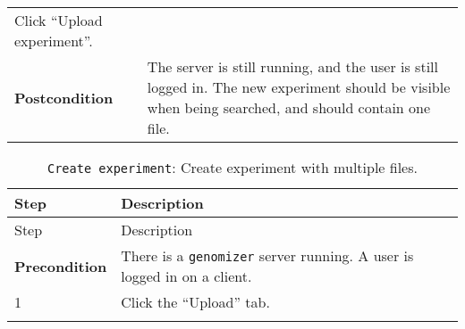 \begin{longtable}[c]{@{}ll@{}}
\begin{minipage}[t]{0.63\columnwidth}\raggedright\strut
Click ``Upload experiment''.
\strut\end{minipage}\tabularnewline
\begin{minipage}[t]{0.31\columnwidth}\raggedright\strut
\textbf{Postcondition}
\strut\end{minipage} &
\begin{minipage}[t]{0.63\columnwidth}\raggedright\strut
The server is still running, and the user is still logged in. The new
experiment should be visible when being searched, and should contain one
file.
\strut\end{minipage}\tabularnewline
\bottomrule
\end{longtable}

\begin{longtable}[c]{@{}ll@{}}
\caption{\texttt{Create\ experiment}: Create experiment with multiple
files.}\tabularnewline
\toprule
\begin{minipage}[b]{0.31\columnwidth}\raggedright\strut
Step
\strut\end{minipage} &
\begin{minipage}[b]{0.63\columnwidth}\raggedright\strut
Description
\strut\end{minipage}\tabularnewline
\midrule
\endfirsthead
\toprule
\begin{minipage}[b]{0.31\columnwidth}\raggedright\strut
Step
\strut\end{minipage} &
\begin{minipage}[b]{0.63\columnwidth}\raggedright\strut
Description
\strut\end{minipage}\tabularnewline
\midrule
\endhead
\begin{minipage}[t]{0.31\columnwidth}\raggedright\strut
\textbf{Precondition}
\strut\end{minipage} &
\begin{minipage}[t]{0.63\columnwidth}\raggedright\strut
There is a \texttt{genomizer} server running. A user is logged in on a
client.
\strut\end{minipage}\tabularnewline
\begin{minipage}[t]{0.31\columnwidth}\raggedright\strut
1
\strut\end{minipage} &
\begin{minipage}[t]{0.63\columnwidth}\raggedright\strut
Click the ``Upload'' tab.
\strut\end{minipage}\tabularnewline
\begin{minipage}[t]{0.31\columnwidth}\raggedright\strut

\end{minipage}
\end{longtable}
